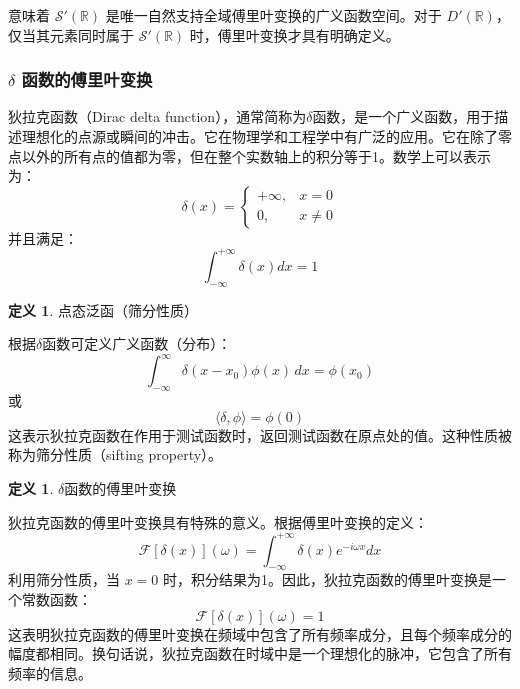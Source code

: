 \documentclass[12pt,a4paper]{article}
\theoremstyle{plain}
\theoremstyle{definition}
\newtheorem{definition}[theorem]{定义}
\theoremstyle{remark}
\begin{document}
意味着 $\mathcal{S}'(\mathbb{R})$ 是唯一自然支持全域傅里叶变换的广义函数空间。对于 $D'(\mathbb{R})$，仅当其元素同时属于 $\mathcal{S}'(\mathbb{R})$ 时，傅里叶变换才具有明确定义。

\subsubsection{$\delta$ 函数的傅里叶变换}
狄拉克函数（Dirac delta function），通常简称为$\delta$函数，是一个广义函数，用于描述理想化的点源或瞬间的冲击。它在物理学和工程学中有广泛的应用。它在除了零点以外的所有点的值都为零，但在整个实数轴上的积分等于1。数学上可以表示为：
\[
\delta(x) = \begin{cases} 
	+\infty, & x = 0 \\
	0, & x \ne 0 
\end{cases}
\]
并且满足：
\[
\int_{-\infty}^{+\infty} \delta(x) dx = 1
\]
\begin{definition}点态泛函（筛分性质）
	
	根据$\delta$函数可定义广义函数（分布）：
	\[
	\int_{-\infty}^{\infty} \delta(x - x_0) \phi(x) \, dx = \phi(x_0)
	\]
	或
	\[
	\langle \delta, \phi \rangle = \phi(0)
	\]
	这表示狄拉克函数在作用于测试函数时，返回测试函数在原点处的值。这种性质被称为筛分性质（sifting property）。
\end{definition}

\begin{definition}$\delta$函数的傅里叶变换
	
狄拉克函数的傅里叶变换具有特殊的意义。根据傅里叶变换的定义：
\[
\mathcal{F}[\delta(x)](\omega) = \int_{-\infty}^{+\infty} \delta(x) e^{-i\omega x} dx
\]
利用筛分性质，当 \(x = 0\) 时，积分结果为1。因此，狄拉克函数的傅里叶变换是一个常数函数：
\[
\mathcal{F}[\delta(x)](\omega) = 1
\]
这表明狄拉克函数的傅里叶变换在频域中包含了所有频率成分，且每个频率成分的幅度都相同。换句话说，狄拉克函数在时域中是一个理想化的脉冲，它包含了所有频率的信息。
\end{definition}
\end{document}
